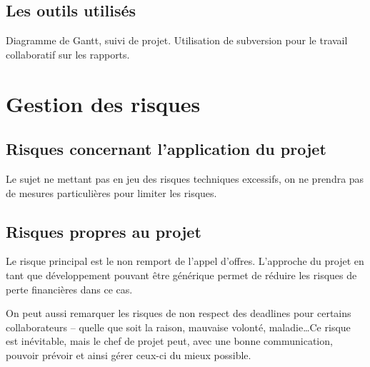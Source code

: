 \documentclass[a4paper, 11pt, draft]{report}
\begin{document}
    \subsection{Les outils utilisés}

Diagramme de Gantt, suivi de projet. Utilisation de subversion pour le travail collaboratif sur les rapports.

\section{Gestion des risques}
    \subsection{Risques concernant l'application du projet}

    Le sujet ne mettant pas en jeu des risques techniques excessifs, on ne prendra pas de mesures particulières pour limiter les risques.

    \subsection{Risques propres au projet}

    Le risque principal est le non remport de l'appel d'offres. L'approche du projet en tant que développement pouvant être générique permet de réduire les risques de perte financières dans ce cas.

    On peut aussi remarquer les risques de non respect des deadlines pour certains collaborateurs -- quelle que soit la raison, mauvaise volonté, maladie\ldots Ce risque est inévitable, mais le chef de projet peut, avec une bonne communication, pouvoir prévoir et ainsi gérer ceux-ci du mieux possible.
\end{document}

